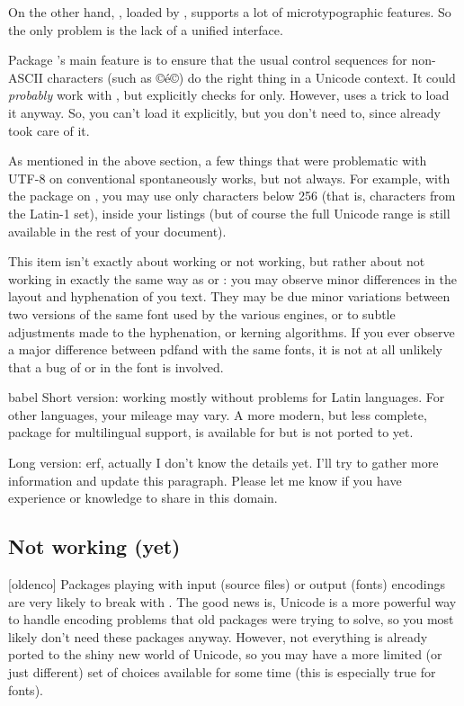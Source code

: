 \documentclass{lltxdoc}
\begin{document}
On the other hand, , loaded by , supports a lot of
microtypographic features. So the only problem is the lack of a unified
interface.

Package 's main feature is to ensure that the usual control
sequences for non-ASCII characters (such as ©\'e©) do the right thing in a
Unicode context. It could \emph{probably} work with \luatex, but explicitly
checks for \xetex only. However,  uses a trick to load it anyway.
So, you can't load it explicitly, but you don't need to, since 
already took care of it.

As mentioned in the above section, a few things that were problematic with
UTF-8 on conventional \latex spontaneously works, but not always. For example,
with the  package on \lualatex, you may use only characters below
256 (that is, characters from the Latin-1 set), inside your listings (but of
course the full Unicode range is still available in the rest of your
document).

This item isn't exactly about working or not working, but rather about not
working in exactly the same way as \pdftex or \xetex: you may observe minor
differences in the layout and hyphenation of you text. They may be due minor
variations between two versions of the same font used by the various engines,
or to subtle adjustments made to the hyphenation, or kerning algorithms. If
you ever observe a major difference between pdf\latex and \lualatex with the
same fonts, it is not at all unlikely that a bug of \luatex or in the font is
involved.

\par{babel}
Short version: working mostly without problems for Latin languages. For other
languages, your mileage may vary. A more modern, but less complete, package
for multilingual support,  is available for \xelatex but is
not ported to \lualatex yet.

Long version: erf, actually I don't know the details yet. I'll try to gather
more information and update this paragraph. Please let me know if you have
experience or knowledge to share in this domain.

\subsection{Not working (yet)}\label{notworking}

[oldenco] Packages playing with input (source files) or
output (fonts) encodings are very likely to break with \luatex. The good news
is, Unicode is a more powerful way to handle encoding problems that old
packages were trying to solve, so you most likely don't need these packages
anyway. However, not everything is already ported to the shiny new world of
Unicode, so you may have a more limited (or just different) set of choices
available for some time (this is especially true for fonts).
\end{document}
